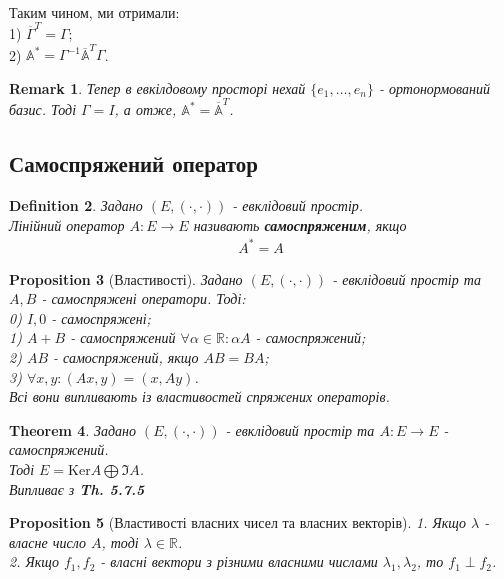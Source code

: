 \documentclass[a4paper, 10pt]{article}
\def\ker#1{\textrm{Ker} {#1}}
\theoremstyle{theoremdd}
\newtheorem{theorem}{Theorem}[subsection]
\theoremstyle{theoremdd}
\newtheorem{definition}[theorem]{Definition}
\theoremstyle{theoremdd}
\theoremstyle{theoremdd}
\theoremstyle{theoremdd}
\newtheorem{proposition}[theorem]{Proposition}
\theoremstyle{theoremdd}
\newtheorem{remark}[theorem]{Remark}
\theoremstyle{theoremdd}
\theoremstyle{theoremdd}
\begin{document}
\bigskip \\
Таким чином, ми отримали:\\
1) $\overline{\Gamma}^T = \Gamma$;\\
2) $\mathbb{A^*} = \Gamma^{-1} \mathbb{\overline{A}}^T \Gamma$.

\begin{remark}
Тепер в евкілдовому просторі нехай $\{e_1,\dots,e_n\}$ - ортонормований базис. Тоді $\Gamma = I$, а отже, $\mathbb{A^*} = \mathbb{\overline{A}}^T$.
\end{remark}

\subsection{Самоспряжений оператор}
\begin{definition}
Задано $(E,(\cdot,\cdot))$ - евклідовий простір.\\
Лінійний оператор $A: E \to E$ називають \textbf{самоспряженим}, якщо
\begin{align*}
A^* = A
\end{align*}
\end{definition}

\begin{proposition}[Властивості]
Задано $(E,(\cdot,\cdot))$ - евклідовий простір та $A,B$ - самоспряжені оператори. Тоді:\\
0) $I,0$ - самоспряжені;\\
1) $A+B$ - самоспряжений \hspace{1cm} $\forall \alpha \in \mathbb{R}: \alpha A$ - самоспряжений;\\
2) $AB$ - самоспряжений, якщо $AB = BA$;\\
3) $\forall x,y: (Ax,y) = (x,Ay)$.\\
\textit{Всі вони випливають із властивостей спряжених операторів.}
\end{proposition}

\begin{theorem}
Задано $(E,(\cdot,\cdot))$ - евклідовий простір та $A: E \to E$ - самоспряжений.\\
Тоді $E = \ker A \bigoplus \Im A$.\\
\textit{Випливає з } \textbf{Th. 5.7.5}
\end{theorem}

\begin{proposition}[Властивості власних чисел та власних векторів]
1. Якщо $\lambda$ - власне число $A$, тоді $\lambda \in \mathbb{R}$.\\
2. Якщо $f_1,f_2$ - власні вектори з різними власними числами $\lambda_1, \lambda_2$, то $f_1 \perp f_2$.
\end{proposition}
\end{document}
